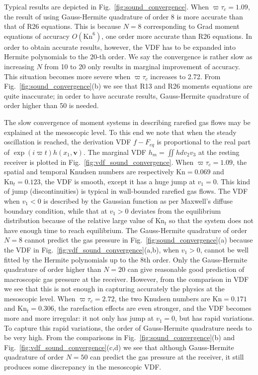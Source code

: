 Typical results are depicted in Fig.~\ref{fig:sound_convergence}. When $\varpi\tau_c=1.09$, the result of using Gauss-Hermite quadrature of order 8 is more accurate than that of R26 equations. This is because $N=8$ corresponding to Grad moment equations of accuracy $O(\text{Kn}^6)$, one order more accurate than R26 equations. In order to obtain accurate results, however, the VDF has to be expanded into Hermite polynomials to the $20$-th order. We say the convergence is rather slow as increasing $N$ from 10 to 20 only results in marginal improvement of accuracy. This situation becomes more severe when $\varpi\tau_c$ increases to 2.72. From Fig.~\ref{fig:sound_convergence}(b) we see that R13 and R26 moments equations are quite inaccurate; in order to have accurate results, Gauss-Hermite quadrature of order higher than 50 is needed.


The slow convergence of moment systems in describing rarefied gas flows may be explained at the mesoscopic level. To this end we note that when the steady oscillation is reached,  the derivation VDF $f-F_{eq}$ is proportional to the real part of $\exp(i\varpi{t})h(x_1,\bm{v})$. The marginal VDF $h_{m}=\iint{hdv_2v_3}$ at the resting receiver is plotted in Fig.~\ref{fig:vdf_sound_convergence}. When $\varpi\tau_c=1.09$, the spatial and temporal Knudsen numbers are respectively $\text{Kn}=0.069$ and $\text{Kn}_t=0.123$, the VDF is smooth, except it has a huge jump at $v_1=0$. This kind of jump (discontinuities) is typical in wall-bounded rarefied gas flows. The VDF when $v_1<0$ is described by the Gaussian function as per Maxwell's diffuse boundary condition, while that at $v_1>0$ deviates from the equilibrium distribution because of the relative large value of $\text{Kn}_t$ so that the system does not have enough time to reach equilibrium. The Gauss-Hermite quadrature of order $N=8$ cannot predict the gas pressure in Fig.~\ref{fig:sound_convergence}(a) because the VDF in Fig.~\ref{fig:vdf_sound_convergence}(a,b), when $v_1>0$, cannot be well fitted by the Hermite polynomials up to the 8th order. Only the Gauss-Hermite quadrature of order higher than $N=20$ can give reasonable good prediction of macroscopic gas pressure at the receiver. However, from the comparison in VDF we see that this is not enough in capturing accurately the physics at the mesoscopic level. 
When $\varpi\tau_c=2.72$, the two Knudsen numbers are $\text{Kn}=0.171$ and $\text{Kn}_t=0.306$, the rarefaction effects are even stronger, and the VDF becomes more and more irregular: it not only has jump at $v_1=0$, but has rapid variations. To capture this rapid variations, the order of Gauss-Hermite quadrature needs to be very high. From the comparisons in Fig.~\ref{fig:sound_convergence}(b) and Fig.~\ref{fig:vdf_sound_convergence}(c,d) we see that although Gauss-Hermite quadrature of order $N=50$ can predict the gas pressure at the receiver, it still produces some discrepancy in the mesoscopic VDF.


